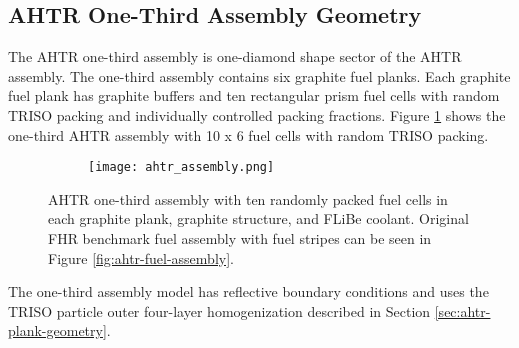 \subsection{AHTR One-Third Assembly Geometry}
\label{sec:ahtr-assem-geometry}
The \gls{AHTR} one-third assembly is one-diamond shape sector of the \gls{AHTR} assembly. 
The one-third assembly contains six graphite fuel planks.
Each graphite fuel plank has graphite buffers and ten rectangular prism fuel cells 
with random TRISO packing and individually controlled packing fractions. 
Figure \ref{fig:ahtr_assembly} shows the one-third \gls{AHTR} assembly with 10 x 6 
fuel cells with random \gls{TRISO} packing.
\begin{figure}[htbp]
    \centering
    \begin{subfigure}{.7\textwidth}
    \texttt{[image: ahtr\_assembly.png]}
    \end{subfigure}%
    \begin{subfigure}{.3\textwidth}
        \vspace{1cm}
    \end{subfigure}
    \caption{\acrfull{AHTR} one-third assembly with ten randomly packed fuel cells 
    in each graphite plank, graphite structure, and \gls{FLiBe} coolant. 
    Original \gls{FHR} benchmark fuel assembly with fuel 
    stripes can be seen in Figure \ref{fig:ahtr-fuel-assembly}.}
    \label{fig:ahtr_assembly}
\end{figure}
The one-third assembly model has reflective boundary conditions and  
uses the \gls{TRISO} particle outer four-layer 
homogenization described in Section \ref{sec:ahtr-plank-geometry}.
\pagebreak

